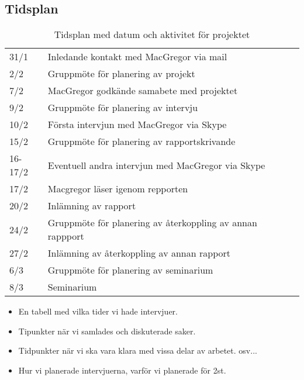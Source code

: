 \subsection{Tidsplan}
\begin{table}[ht]
    \centering
    \caption{Tidsplan med datum och aktivitet för projektet}
    \label{tidsplan}
    \begin{tabular}{lllll}
        31/1 & Inledande kontakt med MacGregor via mail    \\
        2/2 & Gruppmöte för planering av projekt    \\
        7/2 & MacGregor godkände samabete med projektet    \\
        9/2 & Gruppmöte för planering av intervju    \\
        10/2 & Första intervjun med MacGregor via Skype   \\
        15/2 & Gruppmöte för planering av rapportskrivande    \\
        16-17/2 & Eventuell andra intervjun med MacGregor via Skype   \\
        17/2 & Macgregor läser igenom repporten   \\
        20/2 & Inlämning av rapport   \\
        24/2 & Gruppmöte för planering av återkoppling av annan rappport    \\
        27/2 & Inlämning av återkoppling av annan rapport  \\
        6/3 & Gruppmöte för planering av seminarium    \\
        8/3 & Seminarium
    \end{tabular}
\end{table}
\begin{itemize}
    \item En tabell med vilka tider vi hade intervjuer.
    \item Tipunkter när vi samlades och diskuterade saker.
    \item Tidpunkter när vi ska vara klara med vissa delar av arbetet. osv...
    \item Hur vi planerade intervjuerna, varför vi planerade för 2st.
\end{itemize}

